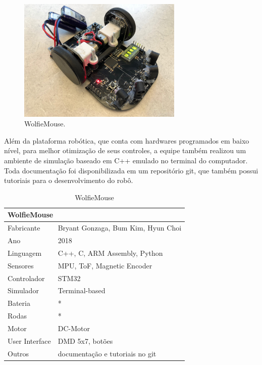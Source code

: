 \begin{figure}[H]
	\centering
	\includegraphics[width=0.7\textwidth]
	{Figures/WolfieMouse_model.jpg}
	\caption{\label{fig:WolfieMouse_model} WolfieMouse.}
\end{figure}

\hspace{0.5cm} Além da plataforma robótica, que conta com hardwares programados em baixo nível, para melhor otimização de seus controles, a equipe também realizou um ambiente de simulação baseado em C++ emulado no terminal do computador. Toda documentação foi disponibilizada em um repositório git, que também possui tutoriais para o desenvolvimento do robô.

\begin{table}[H]
	\centering
	\begin{tabular}{|l|l|}
		\hline
		\multicolumn{2}{|l|}{\textbf{WolfieMouse}} \\ \hline
		Fabricante & Bryant Gonzaga, Bum Kim, Hyun Choi \\ \hline
		Ano & 2018 \\ \hline
		Linguagem & C++, C, ARM Assembly, Python \\ \hline
		Sensores & MPU, ToF, Magnetic Encoder \\ \hline
		Controlador & STM32 \\ \hline
		Simulador & Terminal-based \\ \hline
		Bateria & * \\ \hline
		Rodas & * \\ \hline
		Motor & DC-Motor \\ \hline
		User Interface & DMD 5x7, botões \\ \hline
		Outros & documentação e tutoriais no git \\ \hline
	\end{tabular}
	\caption{\label{tab:WolfieMouse}WolfieMouse}
\end{table}

